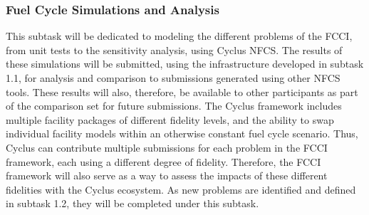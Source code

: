 \subsubsection{Fuel Cycle Simulations and Analysis} 

This subtask will be dedicated to modeling the different problems of the
\gls{FCCI}, from unit tests to the sensitivity analysis, using Cyclus
\gls{NFCS}\cite{CYCLUS}. The results of these simulations will be submitted,
using the infrastructure developed in subtask 1.1, for analysis and comparison
to submissions generated using other \gls{NFCS} tools. These results will
also, therefore, be available to other participants as part of the comparison
set for future submissions. The Cyclus framework includes multiple facility
packages of different fidelity levels, and the ability to swap individual
facility models within an otherwise constant fuel cycle scenario. Thus, Cyclus
can contribute multiple submissions for each problem in the \gls{FCCI}
framework, each using a different degree of fidelity. Therefore, the
\gls{FCCI} framework will also serve as a way to assess the impacts of these
different fidelities with the Cyclus ecosystem. As new problems are identified
and defined in subtask 1.2, they will be completed under this subtask.


